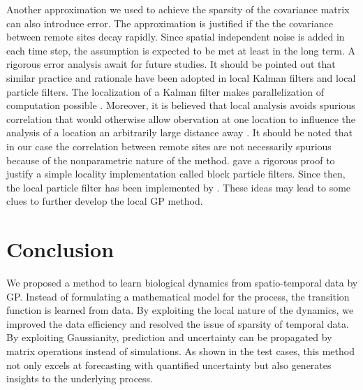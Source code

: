 \documentclass[smallextended,natbib]{svjour3}       %
\begin{document}
Another approximation we used to achieve the sparsity of the covariance matrix can also introduce error. The approximation is justified if the the covariance between remote sites decay rapidly. Since spatial independent noise is added in each time step, the assumption is expected to be met at least in the long term. A rigorous error analysis await for future studies. It should be pointed out that similar practice and rationale have been adopted in local Kalman filters and local particle filters. The localization of a Kalman filter makes parallelization of computation possible \citep{ott2004local,Hunt2007,szunyogh2008local}. Moreover, it is believed that local analysis avoids spurious correlation that would otherwise allow obervation at one location to influence the analysis of a  location an arbitrarily large distance away \citep{Hunt2007}. It should be noted that in our case the correlation between remote sites are not necessarily spurious because of the nonparametric nature of the method. \cite{Rebeschini2015} gave a rigorous proof to justify a simple locality implementation called block particle filters. Since then, the local particle filter has been implemented by \cite{morzfeld2018variational,farchi2018comparison}. These ideas may lead to some clues to further develop the local GP method.     


\section{Conclusion}
We proposed a method to learn biological dynamics from spatio-temporal data by GP.  Instead of formulating a mathematical model for the process,  the transition function is learned from data. By exploiting the local nature of the dynamics, we improved the data efficiency and resolved the issue of sparsity of temporal data. By exploiting Gaussianity, prediction and uncertainty can be propagated by matrix operations instead of simulations. As shown in the test cases, this method not only excels at forecasting with quantified uncertainty but also generates insights to the underlying process. 



%
%
\end{document}
